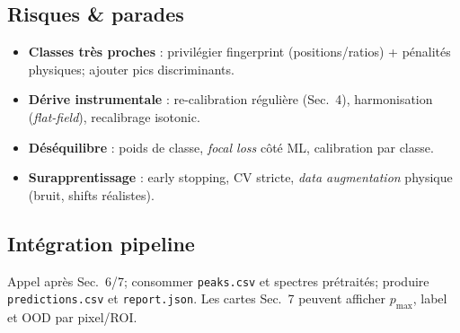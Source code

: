 \subsection{Risques \& parades}
\begin{itemize}[nosep]
\item \textbf{Classes très proches} : privilégier fingerprint (positions/ratios) + pénalités physiques; ajouter pics discriminants.
\item \textbf{Dérive instrumentale} : re-calibration régulière (Sec.~4), harmonisation (\emph{flat-field}), recalibrage isotonic.
\item \textbf{Déséquilibre} : poids de classe, \emph{focal loss} côté ML, calibration par classe.
\item \textbf{Surapprentissage} : early stopping, CV stricte, \emph{data augmentation} physique (bruit, shifts réalistes).
\end{itemize}

\subsection{Intégration pipeline}
Appel après Sec.~6/7; consommer \texttt{peaks.csv} et spectres prétraités; produire \texttt{predictions.csv} et \texttt{report.json}. Les cartes Sec.~7 peuvent afficher $p_{\max}$, label et OOD par pixel/ROI.
